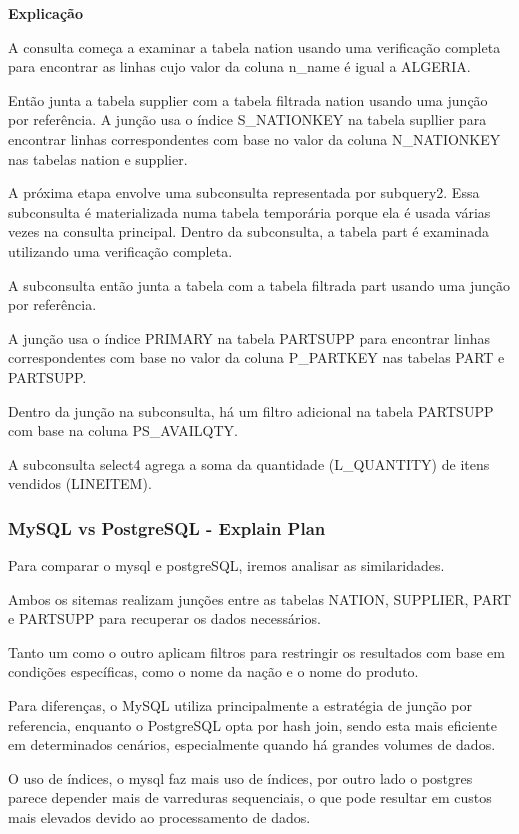 \documentclass{article}
\begin{document}
\textbf{Explicação}\\
\texttt{}\par A consulta começa a examinar a tabela nation usando uma verificação completa para encontrar as linhas cujo valor da coluna n\_name é igual a ALGERIA.

Então junta a tabela supplier com a tabela filtrada nation usando uma junção por referência. A junção usa o índice S\_NATIONKEY na tabela supllier para encontrar linhas correspondentes com base no valor da coluna N\_NATIONKEY nas tabelas nation e supplier.

A próxima etapa envolve uma subconsulta representada por subquery2. Essa subconsulta é materializada numa tabela temporária porque ela é usada várias vezes na consulta principal. Dentro da subconsulta, a tabela part é examinada utilizando uma verificação completa.

A subconsulta então junta a tabela com a tabela filtrada part usando uma junção por referência.

A junção usa o índice PRIMARY na tabela PARTSUPP para encontrar linhas correspondentes com base no valor da coluna P\_PARTKEY nas tabelas PART e PARTSUPP.

Dentro da junção na subconsulta, há um filtro adicional na tabela PARTSUPP com base na coluna PS\_AVAILQTY.

A subconsulta select4 agrega a soma da quantidade (L\_QUANTITY) de itens vendidos (LINEITEM).

\subsubsection{MySQL vs PostgreSQL - Explain Plan}

\texttt{}\par Para comparar o mysql e postgreSQL, iremos analisar as similaridades.

Ambos os sitemas realizam junções entre as tabelas NATION, SUPPLIER, PART e PARTSUPP para recuperar os dados necessários.

Tanto um como o outro aplicam filtros para restringir os resultados com base em condições específicas, como o nome da nação e o nome do produto.

Para diferenças, o MySQL utiliza principalmente a estratégia de junção por referencia, enquanto o PostgreSQL opta por hash join, sendo esta mais eficiente em determinados cenários, especialmente quando há grandes volumes de dados.

O uso de índices, o mysql faz mais uso de índices, por outro lado o postgres parece depender mais de varreduras sequenciais, o que pode resultar em custos mais elevados devido ao processamento de dados.
\end{document}
